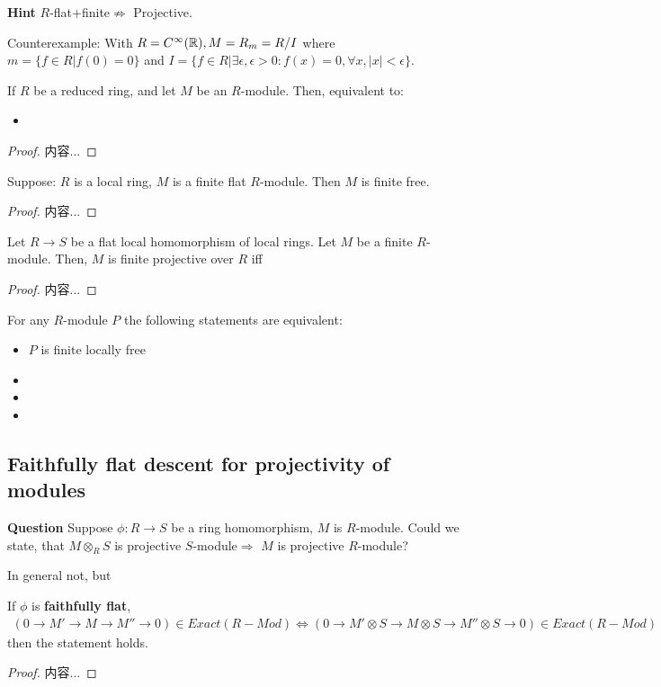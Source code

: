 \documentclass[Total.tex]{subfiles}
\begin{document}
			\textbf{Hint} $R$-flat+finite$\not\Rightarrow$ Projective.
			
			Counterexample: With $R=C^\infty(\mathbb{R}),M=R_m=R/I$ where $m=\{f\in R|f(0)=0\}$ and $I=\{f\in R|\exists\epsilon,\epsilon>0:f(x)=0,\forall x,|x|<\epsilon\}$. 
			
			\begin{proposition}
				If $R$ be a reduced ring, and let $M$ be an $R$-module. Then, equivalent to:
				\begin{itemize}
					\item 
				\end{itemize}
			\end{proposition}
			\begin{proof}
				内容...
			\end{proof}
			\begin{proposition}
				Suppose: $R$ is a local ring, $M$ is a finite flat $R$-module. Then $M$ is finite free.
			\end{proposition}
			\begin{proof}
				内容...
			\end{proof}
			\begin{proposition}
				Let $R\rightarrow S$ be a flat local homomorphism of local rings. Let $M$ be a finite $R$-module. Then, $M$ is finite projective over $R$ iff
			\end{proposition}
			\begin{proof}
				内容...
			\end{proof}
				\begin{proposition}
					For any $R$-module $P$ the following statements are equivalent:
					\begin{itemize}
						\item $P$ is finite locally free
						\item 
						\item 
						\item 
					\end{itemize}
				\end{proposition}
			\subsection{Faithfully flat descent for projectivity of modules}
				\textbf{Question} Suppose $\phi:R\rightarrow S$ be a ring homomorphism, $M$ is $R$-module. Could we state, that $M\otimes_R S$ is projective $S$-module$\Rightarrow$ $M$ is projective $R$-module?
				
				In general not, but
				\begin{proposition}
					If $\phi$ is \textbf{faithfully flat},
					\begin{gather*}
						(0\rightarrow M'\rightarrow M\rightarrow M''\rightarrow 0)\in Exact(R-Mod)\Leftrightarrow  (0\rightarrow M'\otimes S\rightarrow M
						\otimes S\rightarrow M''\otimes S\rightarrow 0)\in Exact(R-Mod)
					\end{gather*} then the statement holds.
				\end{proposition}
				\begin{proof}
					内容...
				\end{proof}
\end{document}
